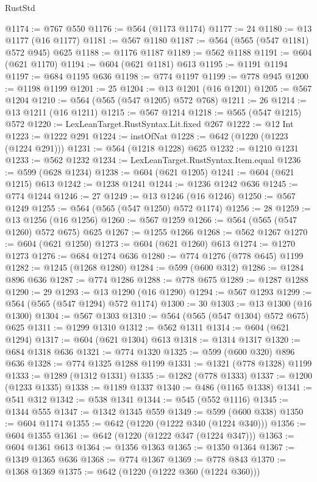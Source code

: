\begin{lexlean}{RustStd}
\begin{coremodule}
@1174 := @767 @550
@1176 := @564 (@1173 @1174)
@1177 := 24
@1180 := @13 @1177 (@16 @1177)
@1181 := @567 @1180
@1187 := @564 (@565 (@547 @1181) @572 @945) @625
@1188 := @1176 @1187
@1189 := @562 @1188
@1191 := @604 (@621 @1170)
@1194 := @604 (@621 @1181) @613
@1195 := @1191 @1194
@1197 := @684 @1195 @636
@1198 := @774 @1197
@1199 := @778 @945
@1200 := @1198 @1199
@1201 := 25
@1204 := @13 @1201 (@16 @1201)
@1205 := @567 @1204
@1210 := @564 (@565 (@547 @1205) @572 @768)
@1211 := 26
@1214 := @13 @1211 (@16 @1211)
@1215 := @567 @1214
@1218 := @565 (@547 @1215) @572
@1220 := LexLeanTarget.RustSyntax.Lit.fixed @267
@1222 := @12 Int
@1223 := @1222 @291
@1224 := instOfNat
@1228 := @642 (@1220 (@1223 (@1224 @291)))
@1231 := @564 (@1218 @1228) @625
@1232 := @1210 @1231
@1233 := @562 @1232
@1234 := LexLeanTarget.RustSyntax.Item.equal
@1236 := @599 (@628 @1234)
@1238 := @604 (@621 @1205)
@1241 := @604 (@621 @1215) @613
@1242 := @1238 @1241
@1244 := @1236 @1242 @636
@1245 := @774 @1244
@1246 := 27
@1249 := @13 @1246 (@16 @1246)
@1250 := @567 @1249
@1255 := @564 (@565 (@547 @1250) @572 @1174)
@1256 := 28
@1259 := @13 @1256 (@16 @1256)
@1260 := @567 @1259
@1266 := @564 (@565 (@547 @1260) @572 @675) @625
@1267 := @1255 @1266
@1268 := @562 @1267
@1270 := @604 (@621 @1250)
@1273 := @604 (@621 @1260) @613
@1274 := @1270 @1273
@1276 := @684 @1274 @636
@1280 := @774 @1276 (@778 @645) @1199
@1282 := @1245 (@1268 @1280)
@1284 := @599 (@600 @312)
@1286 := @1284 @896 @636
@1287 := @774 @1286
@1288 := @778 @675
@1289 := @1287 @1288
@1290 := 29
@1293 := @13 @1290 (@16 @1290)
@1294 := @567 @1293
@1299 := @564 (@565 (@547 @1294) @572 @1174)
@1300 := 30
@1303 := @13 @1300 (@16 @1300)
@1304 := @567 @1303
@1310 := @564 (@565 (@547 @1304) @572 @675) @625
@1311 := @1299 @1310
@1312 := @562 @1311
@1314 := @604 (@621 @1294)
@1317 := @604 (@621 @1304) @613
@1318 := @1314 @1317
@1320 := @684 @1318 @636
@1321 := @774 @1320
@1325 := @599 (@600 @320) @896 @636
@1328 := @774 @1325 @1288 @1199
@1331 := @1321 (@778 @1328) @1199
@1333 := @1289 (@1312 @1331)
@1335 := @1282 (@778 @1333)
@1337 := @1200 (@1233 @1335)
@1338 := @1189 @1337
@1340 := @486 (@1165 @1338)
@1341 := @541 @312
@1342 := @538 @1341
@1344 := @545 (@552 @1116)
@1345 := @1344 @555
@1347 := @1342 @1345 @559
@1349 := @599 (@600 @338)
@1350 := @604 @1174
@1355 := @642 (@1220 (@1222 @340 (@1224 @340)))
@1356 := @604 @1355
@1361 := @642 (@1220 (@1222 @347 (@1224 @347)))
@1363 := @604 @1361 @613
@1364 := @1356 @1363
@1365 := @1350 @1364
@1367 := @1349 @1365 @636
@1368 := @774 @1367
@1369 := @778 @843
@1370 := @1368 @1369
@1375 := @642 (@1220 (@1222 @360 (@1224 @360)))

\end{coremodule}
\end{lexlean}
